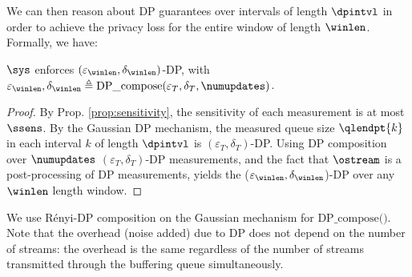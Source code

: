 We can then reason about DP guarantees over intervals of length $\dpintvl$ in
order to achieve the privacy loss for the entire window of length $\winlen$.
%
Formally, we have:
\begin{proposition}\label{prop:dp}
  {$\sys$} enforces $(\varepsilon_{\winlen}, \delta_{\winlen})$-DP, with
  $\varepsilon_{\winlen}, \delta_{\winlen} \triangleq
  \textrm{DP\_compose}(\varepsilon_T, \delta_T, \numupdates)$.
\end{proposition}

\begin{proof}
By Prop. \ref{prop:sensitivity}, the sensitivity of each measurement is at most
  $\ssens$.
By the Gaussian DP mechanism, the measured queue size $\qlendpt{k}$ in each
interval $k$ of length $\dpintvl$ is $(\varepsilon_{T}, \delta_{T})$-DP.
Using DP composition over $\numupdates$ $(\varepsilon_{T}, \delta_{T})$-DP
measurements, and the fact that $\ostream$ is a post-processing of DP
measurements, yields the ($\varepsilon_{\winlen}, \delta_{\winlen}$)-DP over
any $\winlen$ length window.
\end{proof}
We use R\'enyi-DP composition on the Gaussian mechanism for
$\textrm{DP\_compose()}$.
Note that the overhead (\ie noise added) due to
DP does not depend on the number of streams: the overhead is the same regardless
of the number of streams transmitted through the buffering queue simultaneously.


